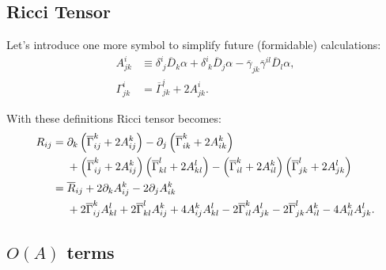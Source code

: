 \documentclass[aps,prd,preprint]{revtex4-1}
\newcommand{\ogamma}{\overline{\gamma}}
\newcommand{\OGamma}{\overline{\Gamma}}
\newcommand{\OD}{\overline{D}}
\begin{document}
\subsection{Ricci Tensor}

Let's introduce one more symbol to simplify future (formidable) calculations:
\begin{align}\label{eq:A}
A^i_{jk} & \equiv
  \delta^i_{\; j} \OD_k \alpha + \delta^i_{\; k} \OD_j \alpha - \ogamma_{jk} \ogamma^{il}  \OD_l \alpha, \\
\Gamma^i_{jk} & = \OGamma^i_{jk} + 2 A^i_{jk}.
\end{align}

With these definitions Ricci tensor becomes:
\begin{align}\label{eq:R-expanded}
R_{ij} = \; & \partial_k \left( \OGamma^k_{ij} + 2 A^k_{ij} \right) -
  \partial_j \left( \OGamma^k_{ik} + 2 A^k_{ik} \right) \notag \\
  & + \left( \OGamma^k_{ij} + 2 A^k_{ij} \right) \left( \OGamma^l_{kl} + 2 A^l_{kl} \right) -
  \left( \OGamma^k_{il} + 2 A^k_{il} \right) \left( \OGamma^l_{jk} + 2 A^l_{jk} \right) \\
= \; & \overline{R}_{ij} + 2 \partial_k A^k_{ij} -2 \partial_j A^k_{ik} \notag \\
  & + 2 \OGamma^k_{ij} A^l_{kl}  + 2 \OGamma^l_{kl} A^k_{ij} + 4 A^k_{ij} A^l_{kl} -
  2 \OGamma^k_{il} A^l_{jk} - 2 \OGamma^l_{jk} A^k_{il} - 4 A^k_{il} A^l_{jk}.
\end{align}

\subsection{\texorpdfstring{$O(A)$}{Single-A} terms}
\end{document}
